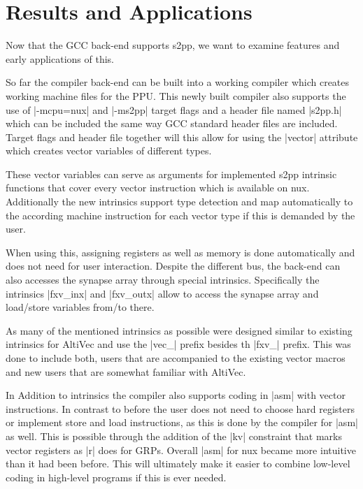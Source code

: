 \chapter{Results and Applications}
\label{chapter:results}

Now that the GCC back-end supports s2pp, we want to examine features and early applications of this.

So far the compiler back-end can be built into a working compiler which creates working machine files for the PPU.
This newly built compiler also supports the use of |-mcpu=nux| and |-ms2pp| target flags and a header file named |s2pp.h| which can be included the same way GCC standard header files are included.
Target flags and header file together will this allow for using the |vector| attribute which creates vector variables of different types.

These vector variables can serve as arguments for implemented s2pp intrinsic functions that cover every vector instruction which is available on nux.
Additionally the new intrinsics support type detection and map automatically to the according machine instruction for each vector type if this is demanded by the user.

When using this, assigning registers as well as memory is done automatically and does not need for user interaction.
Despite the different bus, the back-end can also accesses the synapse array through special intrinsics.
Specifically the intrinsics |fxv_inx| and |fxv_outx| allow to access the synapse array and load/store variables from/to there.

As many of the mentioned intrinsics as possible were designed similar to existing intrinsics for AltiVec and use the |vec_| prefix besides th |fxv_| prefix.
This was done to include both, users that are accompanied to the existing vector macros and new users that are somewhat familiar with AltiVec.

In Addition to intrinsics the compiler also supports coding in |asm| with vector instructions.
In contrast to before the user does not need to choose hard registers or implement store and load instructions, as this is done by the compiler for |asm| as well.
This is possible through the addition of the |kv| constraint that marks vector registers as |r| does for GRPs.
Overall |asm| for nux became more intuitive than it had been before.
This will ultimately make it easier to combine low-level coding in high-level programs if this is ever needed.

